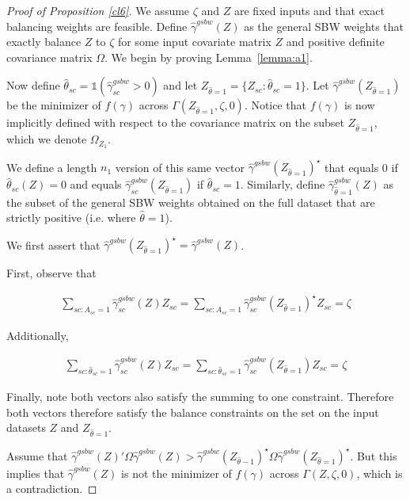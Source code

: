 \begin{proof}[Proof of Proposition \ref{cl6}]
We assume $\zeta$ and $Z$ are fixed inputs and that exact balancing weights are feasible. Define $\hat{\gamma}^{gsbw}(Z)$ as the general SBW weights that exactly balance $Z$ to $\zeta$ for some input covariate matrix $Z$ and positive definite covariance matrix $\Omega$. We begin by proving Lemma~\ref{lemma:a1}.

Now define $\hat{\theta}_{sc} = \mathds{1}(\hat{\gamma}_{sc}^{gsbw} > 0)$ and let $Z_{\hat{\theta} = 1} = \{Z_{sc}: \hat{\theta}_{sc} = 1\}$. Let $\hat{\gamma}^{gsbw}(Z_{\hat{\theta} = 1})$ be the minimizer of $f(\gamma)$ across $\Gamma(Z_{\hat{\theta} = 1}, \zeta, 0)$. Notice that $f(\gamma)$ is now implicitly defined with respect to the covariance matrix on the subset $Z_{\hat{\theta} = 1}$, which we denote $\Omega_{Z_1}$. 

We define a length $n_1$ version of this same vector $\hat{\gamma}^{gsbw}(Z_{\hat{\theta} = 1})^\star$ that equals 0 if $\hat{\theta}_{sc}(Z) = 0$ and equals $\hat{\gamma}^{gsbw}_{sc}(Z_{\hat{\theta} = 1})$ if $\hat{\theta}_{sc} = 1$. Similarly, define $\hat{\gamma}^{gsbw}_{\hat{\theta} = 1}(Z)$ as the subset of the general SBW weights obtained on the full dataset that are strictly positive (i.e. where $\hat{\theta} = 1$).

We first assert that $\hat{\gamma}^{gsbw}(Z_{\hat{\theta} = 1})^\star  = \hat{\gamma}^{gsbw}(Z)$.

First, observe that 

\begin{align*}
\sum_{sc: A_{sc} = 1}\hat{\gamma}_{sc}^{gsbw}(Z) Z_{sc} = \sum_{sc: A_{sc} = 1}\hat{\gamma}^{gsbw}_{sc}(Z_{\hat{\theta} = 1})^\star Z_{sc} = \zeta \end{align*}

Additionally, 

\begin{align*}
 \sum_{sc: \hat{\theta}_{sc} = 1}\hat{\gamma}_{sc}^{gsbw}(Z) Z_{sc} = \sum_{sc: \hat{\theta}_{sc} = 1}\hat{\gamma}_{sc}^{gsbw}(Z_{\hat{\theta} = 1}) Z_{sc} = \zeta   
\end{align*}

Finally, note both vectors also satisfy the summing to one constraint. Therefore both vectors therefore satisfy the balance constraints on the set on the input datasets $Z$ and $Z_{\hat{\theta} = 1}$. 

Assume that $\hat{\gamma}^{gsbw}(Z)'\Omega\hat{\gamma}^{gsbw}(Z) > \hat{\gamma}^{gsbw}(Z_{\hat{\theta} - 1})^\star \Omega\hat{\gamma}^{gsbw}(Z_{\hat{\theta} = 1})^\star$. But this implies that $\hat{\gamma}^{gsbw}(Z)$ is not the minimizer of $f(\gamma)$ across $\Gamma(Z, \zeta, 0)$, which is a contradiction. 


\end{proof}
